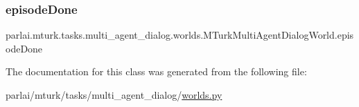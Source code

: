 \subsubsection{\texorpdfstring{episode\+Done}{episodeDone}}
{\footnotesize\ttfamily parlai.\+mturk.\+tasks.\+multi\+\_\+agent\+\_\+dialog.\+worlds.\+M\+Turk\+Multi\+Agent\+Dialog\+World.\+episode\+Done}



The documentation for this class was generated from the following file\+:\begin{DoxyCompactItemize}
\item 
parlai/mturk/tasks/multi\+\_\+agent\+\_\+dialog/\hyperlink{parlai_2mturk_2tasks_2multi__agent__dialog_2worlds_8py}{worlds.\+py}\end{DoxyCompactItemize}
